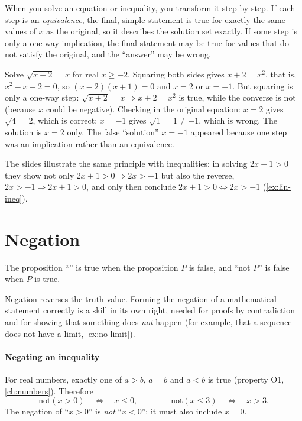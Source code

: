 \begin{core}
When you solve an equation or inequality, you transform it step by step. If each step is an
\emph{equivalence}, the final, simple statement is true for exactly the same values of $x$ as the
original, so it describes the solution set exactly. If some step is only a one-way implication, the
final statement may be true for values that do not satisfy the original, and the ``answer'' may be wrong.
\end{core}

\begin{example}
Solve $\sqrt{x+2}=x$ for real $x\ge -2$.
\solution
Squaring both sides gives $x+2=x^2$, that is, $x^2-x-2=0$, so $(x-2)(x+1)=0$ and $x=2$ or $x=-1$.
But squaring is only a one-way step: $\sqrt{x+2}=x\Rightarrow x+2=x^2$ is true, while the converse is
not (because $x$ could be negative). Checking in the original equation: $x=2$ gives $\sqrt4=2$, which
is correct; $x=-1$ gives $\sqrt1=1\ne-1$, which is wrong. The solution is $x=2$ only. The false
``solution'' $x=-1$ appeared because one step was an implication rather than an equivalence.
\end{example}

The slides illustrate the same principle with inequalities: in solving $2x+1>0$ they show not only
$2x+1>0\Rightarrow 2x>-1$ but also the reverse, $2x>-1\Rightarrow 2x+1>0$, and only then conclude
$2x+1>0\Leftrightarrow 2x>-1$ (\cref{ex:lin-ineq}).

\section{Negation}\label{sec:negation}

\begin{definition}
The proposition ``'' is true when the proposition $P$ is false, and ``not $P$'' is false
when $P$ is true. 
\end{definition}

Negation reverses the truth value. Forming the negation of a mathematical statement correctly is a skill
in its own right, needed for proofs by contradiction and for showing that something does \emph{not}
happen (for example, that a sequence does not have a limit, \cref{ex:no-limit}).

\paragraph{Negating an inequality} For real numbers, exactly one of $a>b$, $a=b$ and $a<b$ is true
(property O1, \cref{ch:numbers}). Therefore
\[
\text{not}(x>0)\quad\Longleftrightarrow\quad x\le 0, \qquad\qquad \text{not}(x\le 3)\quad\Longleftrightarrow\quad x>3.
\]
The negation of ``$x>0$'' is \emph{not} ``$x<0$'': it must also include $x=0$.

